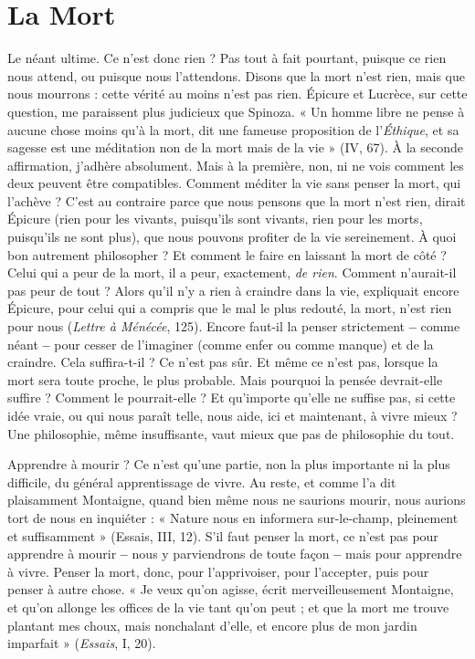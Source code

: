 
\section{La Mort}
Le néant ultime. Ce n’est donc rien ? Pas tout à fait pourtant, puisque
ce rien nous attend, ou puisque nous l’attendons. Disons que la
mort n’est rien, mais que nous mourrons : cette vérité au moins n’est pas rien.
Épicure et Lucrèce, sur cette question, me paraissent plus judicieux que Spinoza.
« Un homme libre ne pense à aucune chose moins qu’à la mort, dit une
fameuse proposition de l’{\it Éthique}, et sa sagesse est une méditation non de la mort
mais de la vie » (IV, 67). À la seconde affirmation, j'adhère absolument. Mais à
la première, non, ni ne vois comment les deux peuvent être compatibles. Comment
méditer la vie sans penser la mort, qui l’achève ? C’est au contraire parce
que nous pensons que la mort n’est rien, dirait Épicure (rien pour les vivants,
puisqu'ils sont vivants, rien pour les morts, puisqu'ils ne sont plus), que nous
pouvons profiter de la vie sereinement. À quoi bon autrement philosopher ? Et
comment le faire en laissant la mort de côté ? Celui qui a peur de la mort, il a
peur, exactement, {\it de rien}. Comment n’aurait-il pas peur de tout ? Alors qu’il n’y
a rien à craindre dans la vie, expliquait encore Épicure, pour celui qui a compris
que le mal le plus redouté, la mort, n’est rien pour nous ({\it Lettre à Ménécée}, 125).
Encore faut-il la penser strictement {\bf --} comme néant {\bf --} pour cesser de l’imaginer
(comme enfer ou comme manque) et de la craindre. Cela suffira-t-il ? Ce n’est
pas sûr. Et même ce n’est pas, lorsque la mort sera toute proche, le plus probable.
Mais pourquoi la pensée devrait-elle suffire ? Comment le pourrait-elle ? Et
qu'importe qu’elle ne suffise pas, si cette idée vraie, ou qui nous paraît telle, nous
aide, ici et maintenant, à vivre mieux ? Une philosophie, même insuffisante, vaut
mieux que pas de philosophie du tout.

Apprendre à mourir ? Ce n’est qu’une partie, non la plus importante ni la
plus difficile, du général apprentissage de vivre. Au reste, et comme l’a dit plaisamment
Montaigne, quand bien même nous ne saurions mourir, nous aurions
tort de nous en inquiéter : « Nature nous en informera sur-le-champ, pleinement
et suffisamment » (Essais, III, 12). S’il faut penser la mort, ce n’est pas
pour apprendre à mourir {\bf --} nous y parviendrons de toute façon {\bf --} mais pour
apprendre à vivre. Penser la mort, donc, pour l’apprivoiser, pour l’accepter,
puis pour penser à autre chose. « Je veux qu’on agisse, écrit merveilleusement
Montaigne, et qu’on allonge les offices de la vie tant qu’on peut ; et que la mort
me trouve plantant mes choux, mais nonchalant d’elle, et encore plus de mon
jardin imparfait » ({\it Essais}, I, 20).

